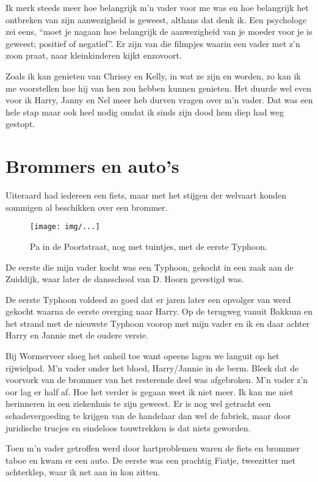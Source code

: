 \documentclass[10pt,twoside,openright]{memoir}
\begin{document}
Ik merk steeds meer hoe belangrijk m'n vader voor me was en hoe belangrijk het ontbreken van zijn aanwezigheid is geweest, althans dat denk ik. Een psychologe zei eens, ``moet je nagaan hoe belangrijk de aanwezigheid van je moeder voor je is geweest; positief of negatief''. Er zijn van die filmpjes waarin een vader met z'n zoon praat, naar kleinkinderen kijkt enzovoort.

Zoals ik kan genieten van Chrissy en Kelly, in wat ze zijn en worden, zo kan ik me voorstellen hoe hij van hen zou hebben kunnen genieten. Het duurde wel even voor ik Harry, Janny en Nel meer heb durven vragen over m'n vader. Dat was een hele stap maar ook heel nodig omdat ik sinds zijn dood hem diep had weg gestopt. 

\chapter{Brommers en auto's} %
\label{cha:brommers_autos}

Uiteraard had iedereen een fiets, maar met het stijgen der welvaart konden sommigen al beschikken over een brommer. 

\begin{figure}[t]
\texttt{[image: img/...]}
\caption{Pa in de Poortstraat, nog met tuintjes, met de eerste Typhoon.}
\end{figure}

De eerste die mijn vader kocht was een Typhoon, gekocht in een zaak aan de Zuiddijk, waar later de dansschool van D. Hoorn gevestigd was. 

De eerste Typhoon voldeed zo goed dat er jaren later een opvolger van werd gekocht waarna de eerste overging naar Harry. Op de terugweg vanuit Bakkum en het strand met de nieuwste Typhoon voorop met mijn vader en ik en daar achter Harry en Jannie met de oudere versie. 

Bij Wormerveer sloeg het onheil toe want opeens lagen we languit op het rijwielpad. M'n vader onder het bloed, Harry/Jannie in de berm. Bleek dat de voorvork van de brommer van het resterende deel was afgebroken. M'n vader z'n oor lag er half af. Hoe het verder is gegaan weet ik niet meer. Ik kan me niet herinneren in een ziekenhuis te zijn geweest. Er is nog wel getracht een schadevergoeding te krijgen van de handelaar dan wel de fabriek, maar door juridische trucjes en eindeloos touwtrekken is dat niets geworden. 

Toen m'n vader getroffen werd door hartproblemen waren de fiets en brommer taboe en kwam er een auto. De eerste was een prachtig Fiatje, tweezitter met achterklep, waar ik net aan in kon zitten. 
\end{document}
